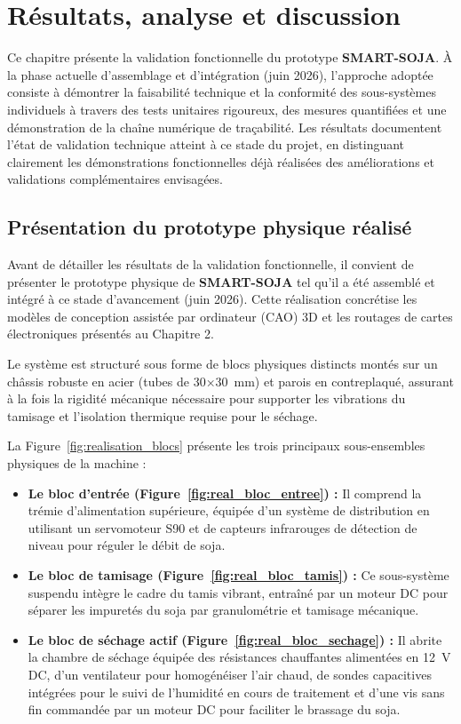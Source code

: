 \chapter{Résultats, analyse et discussion}
\label{chap:resultats}

Ce chapitre présente la validation fonctionnelle du prototype \textbf{SMART-SOJA}. À la phase actuelle d'assemblage et d'intégration (juin 2026), l'approche adoptée consiste à démontrer la faisabilité technique et la conformité des sous-systèmes individuels à travers des tests unitaires rigoureux, des mesures quantifiées et une démonstration de la chaîne numérique de traçabilité. Les résultats documentent l'état de validation technique atteint à ce stade du projet, en distinguant clairement les démonstrations fonctionnelles déjà réalisées des améliorations et validations complémentaires envisagées.

\section{Présentation du prototype physique réalisé}

Avant de détailler les résultats de la validation fonctionnelle, il convient de présenter le prototype physique de \textbf{SMART-SOJA} tel qu'il a été assemblé et intégré à ce stade d'avancement (juin 2026). Cette réalisation concrétise les modèles de conception assistée par ordinateur (CAO) 3D et les routages de cartes électroniques présentés au Chapitre 2.

Le système est structuré sous forme de blocs physiques distincts montés sur un châssis robuste en acier (tubes de 30×30~mm) et parois en contreplaqué, assurant à la fois la rigidité mécanique nécessaire pour supporter les vibrations du tamisage et l'isolation thermique requise pour le séchage.

La Figure~\ref{fig:realisation_blocs} présente les trois principaux sous-ensembles physiques de la machine :
\begin{itemize}
    \item \textbf{Le bloc d'entrée (Figure~\ref{fig:real_bloc_entree}) :} Il comprend la trémie d'alimentation supérieure, équipée d'un système de distribution en utilisant un servomoteur S90 et de capteurs infrarouges de détection de niveau pour réguler le débit de soja.
    \item \textbf{Le bloc de tamisage (Figure~\ref{fig:real_bloc_tamis}) :} Ce sous-système suspendu intègre le cadre du tamis vibrant, entraîné par un moteur DC pour séparer les impuretés du soja par granulométrie et tamisage mécanique.
    \item \textbf{Le bloc de séchage actif (Figure~\ref{fig:real_bloc_sechage}) :} Il abrite la chambre de séchage équipée des résistances chauffantes alimentées en 12~V DC, d'un ventilateur pour homogénéiser l'air chaud, de sondes capacitives intégrées pour le suivi de l'humidité en cours de traitement et d'une vis sans fin commandée par un moteur DC pour faciliter le brassage du soja.
\end{itemize}

